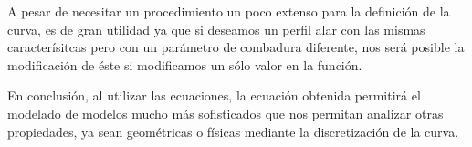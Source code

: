 \documentclass[12pt, letterpaper]{article}
\begin{document}
A pesar de necesitar un procedimiento un poco extenso para la definición de la curva, es de gran utilidad ya que si deseamos un perfil alar con las mismas caracterísitcas pero con un parámetro de combadura diferente, nos será posible la modificación de éste si modificamos un sólo valor en la función.

En conclusión, al utilizar las ecuaciones, la ecuación obtenida permitirá el modelado de modelos mucho más sofisticados que nos permitan analizar otras propiedades, ya sean geométricas o físicas mediante la discretización de la curva.
\renewcommand\refname{References}
\printbibliography
\end{document}

